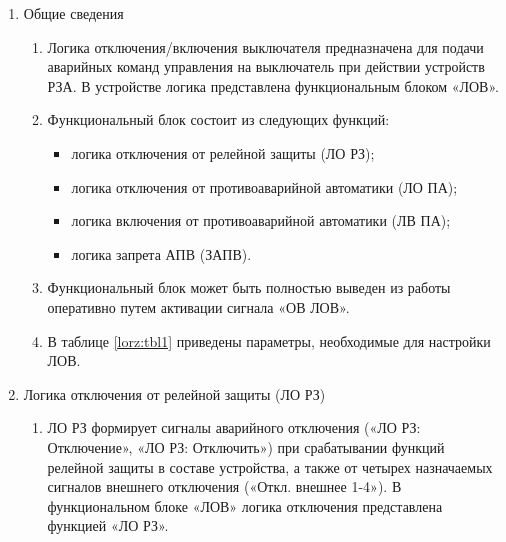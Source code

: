 
\color{black}

\begin{enumerate}

\item Общие сведения

\begin{enumerate}

\item
Логика отключения/включения выключателя предназначена для подачи аварийных команд управления на выключатель при действии устройств РЗА. В устройстве логика представлена функциональным блоком «ЛОВ».

\item
Функциональный блок состоит из следующих функций:
\begin{itemize}
\item логика отключения от релейной защиты (ЛО РЗ); 
\item логика отключения от противоаварийной автоматики (ЛО ПА);
\item логика включения от противоаварийной автоматики (ЛВ ПА);
\item логика запрета АПВ (ЗАПВ).
\end{itemize}

\item
Функциональный блок может быть полностью выведен из работы оперативно путем активации сигнала «ОВ ЛОВ».

\item
В таблице \ref{lorz:tbl1} приведены параметры, необходимые для настройки ЛОВ.


\end{enumerate}


\item Логика отключения от релейной защиты (ЛО РЗ)

\begin{enumerate}

\item
ЛО РЗ формирует сигналы аварийного отключения («ЛО РЗ: Отключение», «ЛО РЗ: Отключить») при срабатывании функций релейной защиты в составе устройства, а также от четырех назначаемых сигналов внешнего отключения («Откл. внешнее 1-4»). В функциональном блоке «ЛОВ» логика отключения представлена функцией «ЛО РЗ». 


\end{enumerate}
\end{enumerate}
